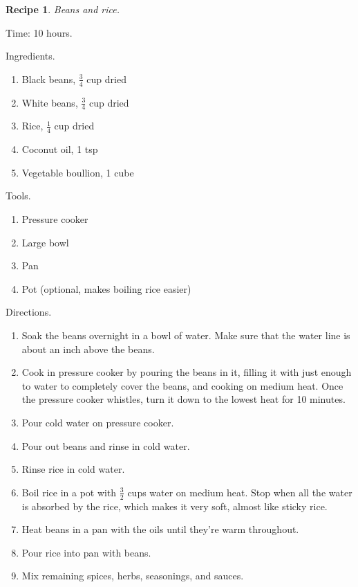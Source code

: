 \documentclass[twocolumn]{amsart}
\newtheorem{rec}{Recipe}
\begin{document}
\begin{rec} Beans and rice. \end{rec}

Time: 10 hours.

Ingredients.

\begin{enumerate}
	\item Black beans, $\frac{3}{4}$ cup dried
	\item White beans, $\frac{3}{4}$ cup dried
	\item Rice, $\frac{1}{4}$ cup dried
	\item Coconut oil, 1 tsp
	\item Vegetable boullion, 1 cube
\end{enumerate}

Tools.

\begin{enumerate}
	\item Pressure cooker
	\item Large bowl
	\item Pan
	\item Pot (optional, makes boiling rice easier)
\end{enumerate}

Directions.

\begin{enumerate}
	\item Soak the beans overnight in a bowl of water. Make sure that the water
		line is about an inch above the beans.
	\item Cook in pressure cooker by pouring the beans in it, filling it with just enough to water to completely cover the beans, and cooking on medium heat. Once the pressure cooker whistles, turn it down to the lowest heat for 10 minutes.
	\item Pour cold water on pressure cooker.
	\item Pour out beans and rinse in cold water.
	\item Rinse rice in cold water.
	\item Boil rice in a pot with $\frac{3}{2}$ cups water on medium heat. Stop
		when all the water is absorbed by the rice, which makes it very soft,
		almost like sticky rice.
	\item Heat beans in a pan with the oils until they're warm throughout.
	\item Pour rice into pan with beans.
	\item Mix remaining spices, herbs, seasonings, and sauces.
\end{enumerate}
\end{document}
